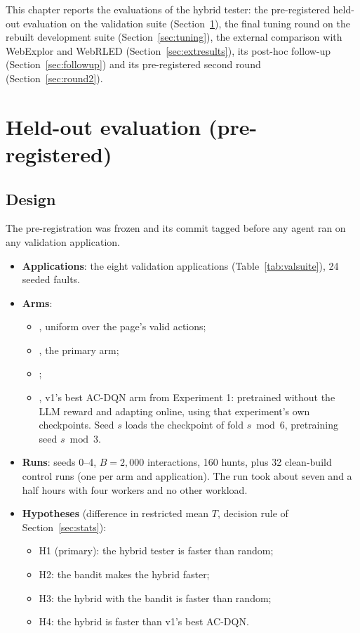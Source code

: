 \label{chap.7}

This chapter reports the evaluations of the hybrid tester: the pre-registered held-out
evaluation on the validation suite (Section~\ref{sec:heldout}), the final tuning round on the
rebuilt development suite (Section~\ref{sec:tuning}), the external comparison with WebExplor
and WebRLED (Section~\ref{sec:extresults}), its post-hoc follow-up
(Section~\ref{sec:followup}) and its pre-registered second round
(Section~\ref{sec:round2}).

\section{Held-out evaluation (pre-registered)}
\label{sec:heldout}

\subsection{Design}

The pre-registration was frozen and its commit tagged before any agent ran on any
validation application.

\begin{itemize}
  \item \textbf{Applications}: the eight validation applications (Table~\ref{tab:valsuite}),
        24 seeded faults.
  \item \textbf{Arms}:
        \begin{itemize}[noitemsep]
          \item {}, uniform over the page's valid actions;
          \item {}, the primary arm;
          \item {};
          \item {}, v1's best AC-DQN arm from Experiment 1: pretrained
                without the LLM reward and adapting online, using that experiment's own
                checkpoints. Seed $s$ loads the checkpoint of fold $s \bmod 6$, pretraining
                seed $s \bmod 3$.
        \end{itemize}
  \item \textbf{Runs}: seeds 0--4, $B = 2{,}000$ interactions, 160 hunts, plus 32 clean-build
        control runs (one per arm and application). The run took about seven and a half
        hours with four workers and no other workload.
  \item \textbf{Hypotheses} (difference in restricted mean $T$, decision rule of
        Section~\ref{sec:stats}):
        \begin{itemize}[noitemsep]
          \item H1 (primary): the hybrid tester is faster than random;
          \item H2: the bandit makes the hybrid faster;
          \item H3: the hybrid with the bandit is faster than random;
          \item H4: the hybrid is faster than v1's best AC-DQN.
        \end{itemize}
\end{itemize}

